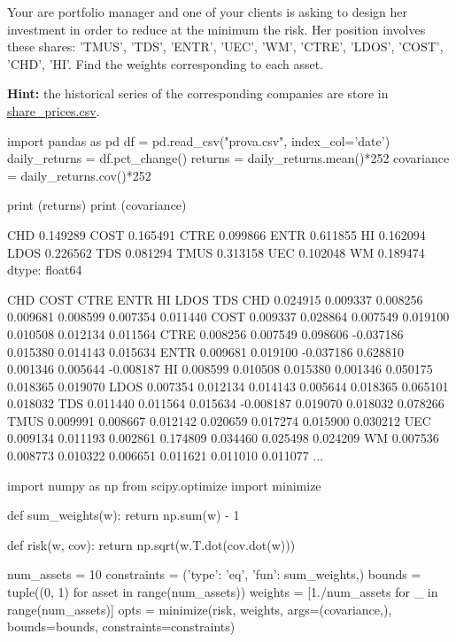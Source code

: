 \begin{question}
Your are portfolio manager and one of your clients is asking to design her investment in order to reduce at the minimum the risk. Her position involves these shares: 'TMUS', 'TDS', 'ENTR', 'UEC', 'WM', 'CTRE', 'LDOS', 'COST', 'CHD', 'HI'.
Find the weights corresponding to each asset.

\noindent\textbf{Hint:} the historical series of the corresponding companies are store in \href{https://drive.google.com/file/d/1ARryI7zpNVqlpzPsrNS2rTH9Knj07JBV/view?usp=sharing}{share\_prices.csv}.

\end{question}

\cprotEnv \begin{solution}
\begin{ipython}
import pandas as pd
df = pd.read_csv("prova.csv", index_col='date')
daily_returns = df.pct_change()
returns = daily_returns.mean()*252
covariance = daily_returns.cov()*252

print (returns)
print (covariance)
\end{ipython}
\begin{ioutput}
CHD 	0.149289
COST 	0.165491
CTRE 	0.099866
ENTR 	0.611855
HI      0.162094
LDOS 	0.226562
TDS 	0.081294
TMUS 	0.313158
UEC 	0.102048
WM      0.189474
dtype: float64

          CHD     COST      CTRE      ENTR       HI     LDOS       TDS
CHD  0.024915 0.009337  0.008256  0.009681 0.008599 0.007354  0.011440
COST 0.009337 0.028864  0.007549  0.019100 0.010508 0.012134  0.011564
CTRE 0.008256 0.007549  0.098606 -0.037186 0.015380 0.014143  0.015634
ENTR 0.009681 0.019100 -0.037186  0.628810 0.001346 0.005644 -0.008187
HI   0.008599 0.010508  0.015380  0.001346 0.050175 0.018365  0.019070
LDOS 0.007354 0.012134  0.014143  0.005644 0.018365 0.065101  0.018032
TDS  0.011440 0.011564  0.015634 -0.008187 0.019070 0.018032  0.078266
TMUS 0.009991 0.008667  0.012142  0.020659 0.017274 0.015900  0.030212
UEC  0.009134 0.011193  0.002861  0.174809 0.034460 0.025498  0.024209
WM   0.007536 0.008773  0.010322  0.006651 0.011621 0.011010  0.011077
...
\end{ioutput}
\begin{ipython}
import numpy as np
from scipy.optimize import minimize

def sum_weights(w):
    return np.sum(w) - 1

def risk(w, cov):
    return np.sqrt(w.T.dot(cov.dot(w)))

num_assets = 10
constraints = ({'type': 'eq', 'fun': sum_weights},)
bounds = tuple((0, 1) for asset in range(num_assets))
weights = [1./num_assets for _ in range(num_assets)]
opts = minimize(risk, weights, args=(covariance,),
                bounds=bounds, constraints=constraints)


\end{ipython}
\end{solution}
